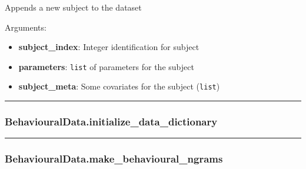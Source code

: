 \begin{Shaded}
\begin{Highlighting}[]
\end{Highlighting}
\end{Shaded}

Appends a new subject to the dataset

Arguments:

\begin{itemize}
\tightlist
\item
  \textbf{subject\_index}: Integer identification for subject
\item
  \textbf{parameters}: \texttt{list} of parameters for the subject
\item
  \textbf{subject\_meta}: Some covariates for the subject
  (\texttt{list})
\end{itemize}

\begin{center}\rule{0.5\linewidth}{\linethickness}\end{center}

\subsubsection{BehaviouralData.initialize\_data\_dictionary}\label{behaviouraldata.initialize_data_dictionary}

\begin{Shaded}
\begin{Highlighting}[]
\NormalTok{)}
\end{Highlighting}
\end{Shaded}

\begin{center}\rule{0.5\linewidth}{\linethickness}\end{center}

\subsubsection{BehaviouralData.make\_behavioural\_ngrams}\label{behaviouraldata.make_behavioural_ngrams}

\begin{Shaded}
\begin{Highlighting}[]
\end{Highlighting}
\end{Shaded}

